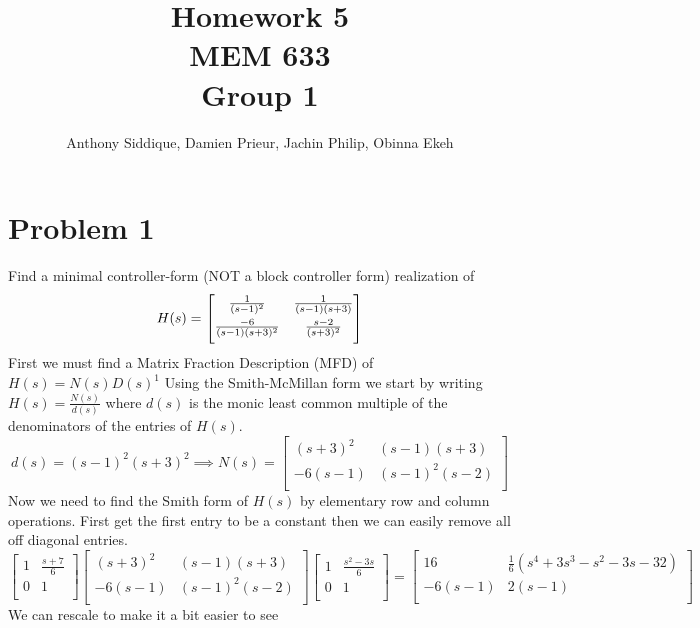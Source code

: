 \documentclass{article}
\author{Anthony Siddique, Damien Prieur, Jachin Philip, Obinna Ekeh}
\title{Homework 5\\ MEM 633 \\ Group 1}
\date{}
\begin{document}
\maketitle

\section*{Problem 1}
Find a minimal controller-form (NOT a block controller form) realization of
\[
H(s) =
\setlength{\delimitershortfall}{0pt}
\begin{bmatrix}
\frac{1}{(s-1)^2} & \frac{1}{(s-1)(s+3)} \\[0.5em]
\frac{-6}{(s-1)(s+3)^2} & \frac{s-2}{(s+3)^2} \\[0.5em]
\end{bmatrix}
\]
\newline
\newline
First we must find a Matrix Fraction Description (MFD) of \(H(s) = N(s)D(s)^{1}\)
Using the Smith-McMillan form we start by writing \(H(s) = \frac{N(s)}{d(s)}\) where \(d(s)\) is the monic least common multiple of the denominators of the entries of \(H(s)\).
\[
d(s) = (s-1)^2(s+3)^2 \implies
N(s) =
\begin{bmatrix}
(s+3)^2 & (s-1)(s+3) \\
-6(s-1) & (s-1)^2(s-2) \\
\end{bmatrix}
\]
Now we need to find the Smith form of \(H(s)\) by elementary row and column operations.
First get the first entry to be a constant then we can easily remove all off diagonal entries.
\[
\begin{bmatrix}
1 & \frac{s+7}{6} \\
0 & 1 \\
\end{bmatrix}
\begin{bmatrix}
(s+3)^2 & (s-1)(s+3) \\
-6(s-1) & (s-1)^2(s-2) \\
\end{bmatrix}
\begin{bmatrix}
1 & \frac{s^2-3s}{6}\\
0 & 1 \\
\end{bmatrix}
=
\begin{bmatrix}
16 & \frac{1}{6}(s^4 + 3s^3 -s^2 -3s - 32) \\
-6(s-1) & 2(s-1) \\
\end{bmatrix}
\]
We can rescale to make it a bit easier to see
\end{document}

